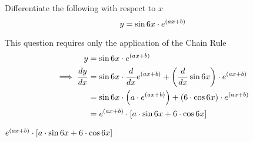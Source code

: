 


\question[1] Differentiate the following with respect to $x$
\[y = \sin6 x\cdot e^{(ax + b)}\]

\watchout

\begin{solution}[\mcq]
	This question requires only the application of the Chain Rule 
	\begin{align}
		y &= \sin6 x\cdot e^{(ax + b)} \nonumber\\
	   \implies \dfrac{dy}{dx} &= \sin6 x\cdot\dfrac{d}{dx}e^{(ax + b)} 
	   + \left(\dfrac{d}{dx}\sin6 x\right)\cdot e^{(ax + b)} \\
	   &= \sin6 x\cdot\left( a\cdot e^{(ax + b)}\right) + 
	   \left( 6\cdot\cos6 x\right)\cdot e^{(ax+b)} \\
	   &= e^{(ax+b)}\cdot\left[ a\cdot\sin6 x + 6\cdot\cos6 x\right]
	\end{align}
\end{solution}

\ifprintanswers
  \begin{codex}
	   $e^{(ax+b)}\cdot\left[ a\cdot\sin6 x + 6\cdot\cos6 x\right]$
  \end{codex}
\fi 

